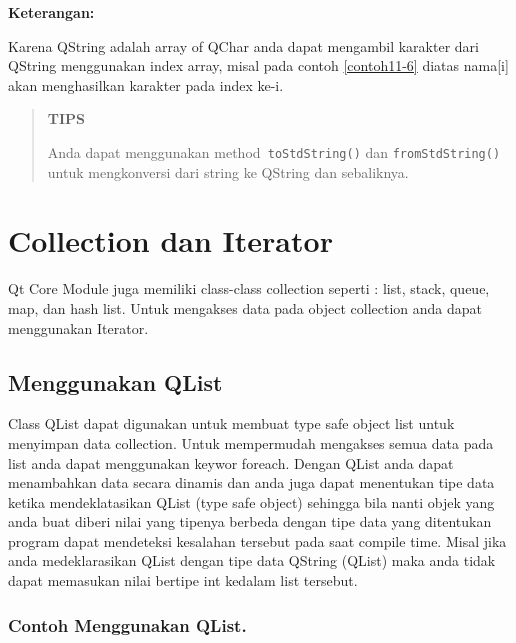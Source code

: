 \textbf{Keterangan:}

  Karena QString adalah array of QChar anda dapat mengambil karakter
  dari QString menggunakan index array, misal pada contoh \ref{contoh11-6} diatas
  nama{[}i{]} akan menghasilkan karakter pada index ke-i.

\begin{quotation}
{\LARGE {}}  	\textbf{TIPS} 
	
	Anda dapat
	menggunakan method\texttt{ toStdString()} dan \texttt{fromStdString()} untuk mengkonversi
	dari string ke QString dan sebaliknya.
\end{quotation}
 

\section{Collection dan Iterator}\label{collection-dan-iterator}

Qt Core Module juga memiliki class-class collection seperti : list,
stack, queue, map, dan hash list. Untuk mengakses data pada object
collection anda dapat menggunakan Iterator.

\subsection{Menggunakan QList}\label{menggunakan-qlist}

Class QList dapat digunakan untuk membuat type safe object list untuk
menyimpan data collection. Untuk mempermudah mengakses semua data pada
list anda dapat menggunakan keywor foreach. Dengan QList anda dapat
menambahkan data secara dinamis dan anda juga dapat menentukan tipe data
ketika mendeklatasikan QList (type safe object) sehingga bila nanti
objek yang anda buat diberi nilai yang tipenya berbeda dengan tipe data
yang ditentukan program dapat mendeteksi kesalahan tersebut pada saat
compile time. Misal jika anda medeklarasikan QList dengan tipe data
QString (QList) maka anda tidak dapat memasukan nilai bertipe int
kedalam list tersebut.

\subsubsection*{Contoh Menggunakan QList.}

